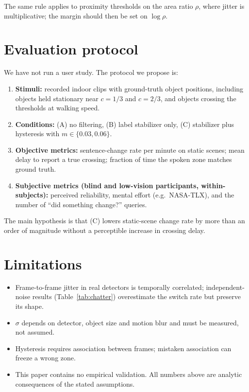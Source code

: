 \documentclass[11pt,a4paper]{article}
\begin{document}
The same rule applies to proximity thresholds on the area ratio $\rho$, where jitter is multiplicative; the margin should then be set on $\log\rho$.

\section{Evaluation protocol}\label{sec:protocol}
We have not run a user study. The protocol we propose is:
\begin{enumerate}[nosep]
  \item \textbf{Stimuli:} recorded indoor clips with ground-truth object positions, including objects held stationary near $c=1/3$ and $c=2/3$, and objects crossing the thresholds at walking speed.
  \item \textbf{Conditions:} (A) no filtering, (B) label stabilizer only, (C) stabilizer plus hysteresis with $m\in\{0.03,0.06\}$.
  \item \textbf{Objective metrics:} sentence-change rate per minute on static scenes; mean delay to report a true crossing; fraction of time the spoken zone matches ground truth.
  \item \textbf{Subjective metrics (blind and low-vision participants, within-subjects):} perceived reliability, mental effort (e.g.\ NASA-TLX), and the number of ``did something change?'' queries.
\end{enumerate}
The main hypothesis is that (C) lowers static-scene change rate by more than an order of magnitude without a perceptible increase in crossing delay.

\section{Limitations}\label{sec:limits}
\begin{itemize}[nosep]
  \item Frame-to-frame jitter in real detectors is temporally correlated; independent-noise results (Table~\ref{tab:chatter}) overestimate the switch rate but preserve its shape.
  \item $\sigma$ depends on detector, object size and motion blur and must be measured, not assumed.
  \item Hysteresis requires association between frames; mistaken association can freeze a wrong zone.
  \item This paper contains no empirical validation. All numbers above are analytic consequences of the stated assumptions.
\end{itemize}
\end{document}

